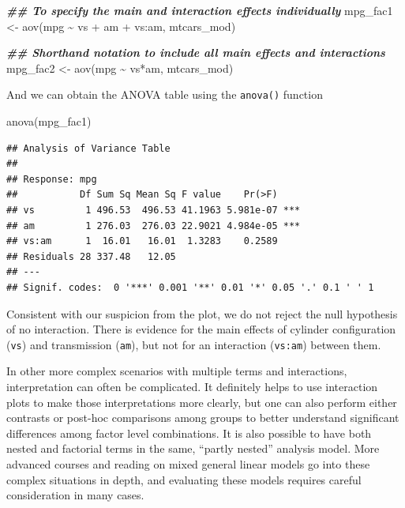 \documentclass[
]{book}
\newenvironment{Shaded}{\begin{snugshade}}{\end{snugshade}}
\newcommand{\DocumentationTok}[1]{\textcolor[rgb]{0.56,0.35,0.01}{\textbf{\textit{#1}}}}
\newcommand{\FunctionTok}[1]{\textcolor[rgb]{0.00,0.00,0.00}{#1}}
\newcommand{\NormalTok}[1]{#1}
\newcommand{\OtherTok}[1]{\textcolor[rgb]{0.56,0.35,0.01}{#1}}
\newcommand{\SpecialCharTok}[1]{\textcolor[rgb]{0.00,0.00,0.00}{#1}}
\begin{document}
\begin{Shaded}
\begin{Highlighting}[]
\DocumentationTok{\#\# To specify the main and interaction effects individually}
\NormalTok{mpg\_fac1 }\OtherTok{\textless{}{-}} \FunctionTok{aov}\NormalTok{(mpg }\SpecialCharTok{\textasciitilde{}}\NormalTok{ vs }\SpecialCharTok{+}\NormalTok{ am }\SpecialCharTok{+}\NormalTok{ vs}\SpecialCharTok{:}\NormalTok{am, mtcars\_mod)}

\DocumentationTok{\#\# Shorthand notation to include all main effects and interactions}
\NormalTok{mpg\_fac2 }\OtherTok{\textless{}{-}} \FunctionTok{aov}\NormalTok{(mpg }\SpecialCharTok{\textasciitilde{}}\NormalTok{ vs}\SpecialCharTok{*}\NormalTok{am, mtcars\_mod)}
\end{Highlighting}
\end{Shaded}

And we can obtain the ANOVA table using the \texttt{anova()} function

\begin{Shaded}
\begin{Highlighting}[]
\FunctionTok{anova}\NormalTok{(mpg\_fac1)}
\end{Highlighting}
\end{Shaded}

\begin{verbatim}
## Analysis of Variance Table
## 
## Response: mpg
##           Df Sum Sq Mean Sq F value    Pr(>F)    
## vs         1 496.53  496.53 41.1963 5.981e-07 ***
## am         1 276.03  276.03 22.9021 4.984e-05 ***
## vs:am      1  16.01   16.01  1.3283    0.2589    
## Residuals 28 337.48   12.05                      
## ---
## Signif. codes:  0 '***' 0.001 '**' 0.01 '*' 0.05 '.' 0.1 ' ' 1
\end{verbatim}

Consistent with our suspicion from the plot, we do not reject the null hypothesis of no interaction. There is evidence for the main effects of cylinder configuration (\texttt{vs}) and transmission (\texttt{am}), but not for an interaction (\texttt{vs:am}) between them.

In other more complex scenarios with multiple terms and interactions, interpretation can often be complicated. It definitely helps to use interaction plots to make those interpretations more clearly, but one can also perform either contrasts or post-hoc comparisons among groups to better understand significant differences among factor level combinations. It is also possible to have both nested and factorial terms in the same, ``partly nested'' analysis model. More advanced courses and reading on mixed general linear models go into these complex situations in depth, and evaluating these models requires careful consideration in many cases.
\end{document}
